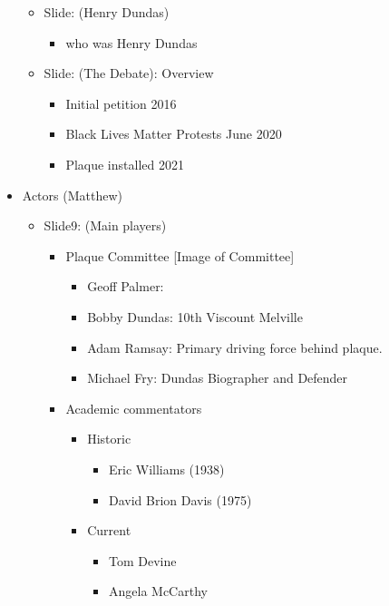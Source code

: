 \documentclass{scrartcl}
\begin{document}
\begin{itemize}
\begin{itemize}
        \item Slide: (Henry Dundas)
        \begin{itemize}
            \item who was Henry Dundas
        \end{itemize}
        \item Slide: (The Debate): Overview
        \begin{itemize}
            \item Initial petition 2016
            \item Black Lives Matter Protests June 2020
            \item Plaque installed 2021

        \end{itemize}
    \end{itemize}
    \item Actors (Matthew)
    \begin{itemize}
        \item Slide9: (Main players)
        \begin{itemize}
            \item Plaque Committee [Image of Committee]
            \begin{itemize}
                \item Geoff Palmer:
                \item Bobby Dundas: 10th Viscount Melville
                \item Adam Ramsay: Primary driving force behind plaque.
                \item Michael Fry: Dundas Biographer and Defender 
            \end{itemize}
            \item Academic commentators
            \begin{itemize}
                \item Historic
                \begin{itemize}
                    \item Eric Williams (1938)
                    \item David Brion Davis (1975)
                \end{itemize}
                \item Current
                \begin{itemize}
                    \item Tom Devine
                    \item Angela McCarthy
                \end{itemize}

\end{itemize}
\end{itemize}
\end{itemize}
\end{itemize}
\end{document}
